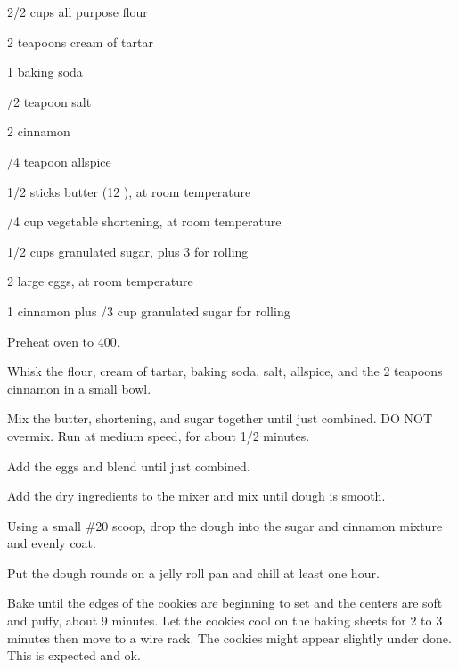 \begin{IngredientsAndSteps}
    \ListIngredientsAndSteps
    {
        2/2 cups all purpose flour

        2 teapoons cream of tartar

        1 \tsp baking soda

        /2 teapoon salt

        2 \tsp[s] cinnamon

        /4 teapoon allspice

        \IngredientsSeparatorClear

        1/2 sticks butter (12 \Tbl[s]), at room temperature

        /4 cup vegetable shortening, at room temperature

        1/2 cups granulated sugar, plus 3 \Tbl[s] for rolling

        2 large eggs, at room temperature

        1 \Tbl cinnamon plus /3 cup granulated sugar for rolling

    }
    {
        Preheat oven to 400\Degrees[F].

        Whisk the flour, cream of tartar, baking soda, salt, allspice, and the 2 teapoons cinnamon
        in a small bowl.

        Mix the butter, shortening, and sugar together until just combined. DO NOT overmix. Run at
        medium speed, for about 1/2 minutes.

        Add the eggs and blend until just combined.

        Add the dry ingredients to the mixer and mix until dough is smooth.

        Using a small \#20 scoop, drop the dough into the sugar and cinnamon mixture and
        evenly coat.

        Put the dough rounds on a jelly roll pan and chill at least one hour.

        Bake until the edges of the cookies are beginning to set and the centers are soft
        and puffy, about 9 minutes. Let the cookies cool on the baking sheets for 2 to 3
        minutes then move to a wire rack. The cookies might appear slightly under done. This
        is expected and ok.
    }
\end{IngredientsAndSteps}

%
%
%
%
\newpage



